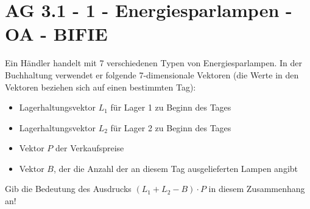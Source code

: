 \section{AG 3.1 - 1 - Energiesparlampen - OA - BIFIE}

\begin{beispiel}[AG 3.1]{1} %
Ein Händler handelt mit 7 verschiedenen Typen von Energiesparlampen. In der Buchhaltung verwendet er folgende 7-dimensionale Vektoren (die Werte in den Vektoren beziehen sich auf einen bestimmten Tag):
\begin{itemize}
	\item Lagerhaltungsvektor $L_{1}$ für Lager 1 zu Beginn des Tages
	\item Lagerhaltungsvektor $L_{2}$ für Lager 2 zu Beginn des Tages
	\item Vektor $P$ der Verkaufspreise
	\item Vektor $B$, der die Anzahl der an diesem Tag ausgelieferten Lampen angibt
\end{itemize}

Gib die Bedeutung des Ausdrucks $(L_{1}+L_{2}-B)\cdot P$ in diesem Zusammenhang an!

\end{beispiel}